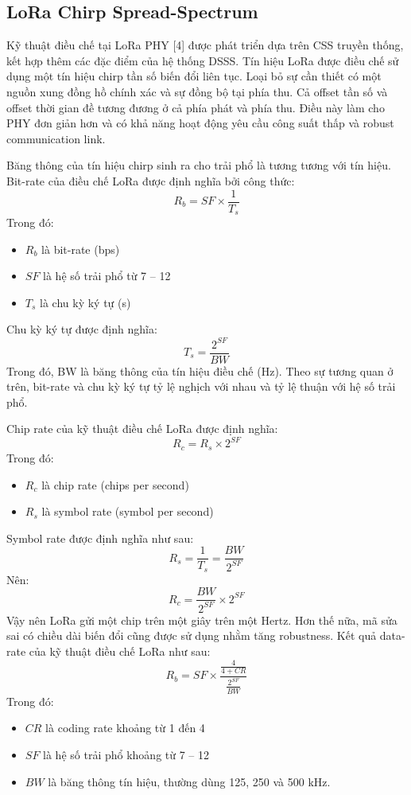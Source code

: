	\subsection{LoRa Chirp Spread-Spectrum}
	Kỹ thuật điều chế tại LoRa PHY [4] được phát triển dựa trên CSS truyền thống, kết hợp thêm các đặc điểm của hệ thống DSSS. Tín hiệu LoRa được điều chế sử dụng một tín hiệu chirp tần số biến đổi liên tục. Loại bỏ sự cần thiết có một nguồn xung đồng hồ chính xác và sự đồng bộ tại phía thu. Cả offset tần số và offset thời gian đề tương đương ở cả phía phát và phía thu. Điều này làm cho PHY đơn giản hơn và có khả năng hoạt động yêu cầu công suất thấp và robust communication link. \par  
	Băng thông của tín hiệu chirp sinh ra cho trải phổ là tương tương với tín hiệu.
Bit-rate của điều chế LoRa được định nghĩa bởi công thức:
	\begin{equation}
	R_b = SF \times \frac{1}{T_s}
	\end{equation}
	Trong đó: 
\begin{itemize}
\item	$R_b$  là bit-rate (bps) 
\item	$SF$ là hệ số trải phổ từ 7 – 12 
\item	$T_s$ là chu kỳ ký tự (s) 
\end{itemize}
	Chu kỳ ký tự được định nghĩa:
	\begin{equation}
	T_s = \frac{2^{SF}}{BW}
	\end{equation}
	Trong đó, BW là băng thông của tín hiệu điều chế (Hz). Theo sự tương quan ở trên, bit-rate và chu kỳ ký tự tỷ lệ nghịch với nhau và tỷ lệ thuận với hệ số trải phổ. \par 
Chip rate của kỹ thuật điều chế LoRa được định nghĩa:
\begin{equation}
R_c = R_s \times 2^{SF}
\end{equation}
Trong đó: 
\begin{itemize}
\item	$R_c$  là chip rate (chips per second) 
\item	$R_s$  là symbol rate (symbol per second) 
\end{itemize}
	Symbol rate được định nghĩa như sau: 
	\begin{equation}
	R_s = \frac{1}{T_s} = \frac{BW}{2^{SF}}
	\end{equation}
	Nên:
	\begin{equation}
	R_c = \frac{BW}{2^{SF}}\times 2^{SF}
	\end{equation}
	Vậy nên LoRa gửi một chip trên một giây trên một Hertz. Hơn thế nữa, mã sửa sai có chiều dài biến đổi cũng được sử dụng nhằm tăng robustness. Kết quả data-rate của kỹ thuật điều chế LoRa như sau:
	\begin{equation}
	R_b = SF \times \frac{\frac{4}{4+CR}}{\frac{2^{SF}}{BW}}
	\end{equation}
	Trong đó:
\begin{itemize}
\item	$CR$ là coding rate khoảng từ 1 đến 4
\item	$SF$ là hệ số trải phổ khoảng từ 7 – 12
\item	$BW$ là băng thông tín hiệu, thường dùng 125, 250 và 500 kHz.
\end{itemize}


